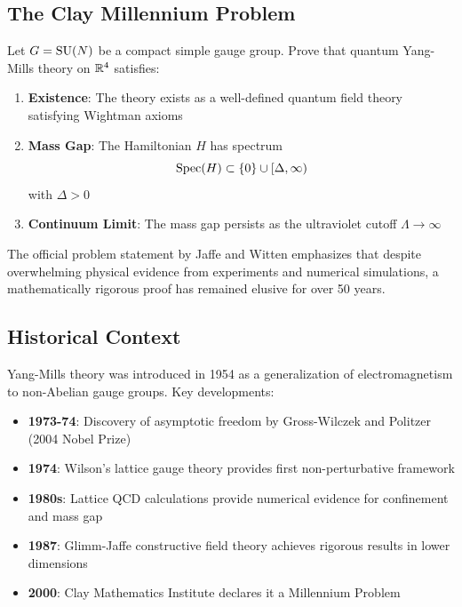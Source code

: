 \subsection{The Clay Millennium Problem}

\begin{defn}\label{def:ym-problem}
Let $G = \mathrm{SU}(N)$ be a compact simple gauge group. Prove that quantum Yang-Mills theory on $\mathbb{R}^4$ satisfies:

\begin{enumerate}
\item \textbf{Existence}: The theory exists as a well-defined quantum field theory satisfying Wightman axioms\cite{wightman1956quantum}
\item \textbf{Mass Gap}: The Hamiltonian $H$ has spectrum
\begin{equation}
\operatorname{Spec}(H) \subset \{0\} \cup [\Delta, \infty)
\end{equation}
with $\Delta > 0$
\item \textbf{Continuum Limit}: The mass gap persists as the ultraviolet cutoff $\Lambda \to \infty$
\end{enumerate}
\end{defn}

The official problem statement by Jaffe and Witten\cite{jaffe2006quantum} emphasizes that despite overwhelming physical evidence from experiments and numerical simulations, a mathematically rigorous proof has remained elusive for over 50 years.

\subsection{Historical Context}

Yang-Mills theory was introduced in 1954\cite{yang1954conservation} as a generalization of electromagnetism to non-Abelian gauge groups. Key developments:

\begin{itemize}
\item \textbf{1973-74}: Discovery of asymptotic freedom by Gross-Wilczek\cite{gross1973ultraviolet} and Politzer\cite{politzer1973reliable} (2004 Nobel Prize)
\item \textbf{1974}: Wilson's lattice gauge theory\cite{wilson1974confinement} provides first non-perturbative framework
\item \textbf{1980s}: Lattice QCD calculations\cite{creutz1980monte} provide numerical evidence for confinement and mass gap
\item \textbf{1987}: Glimm-Jaffe constructive field theory\cite{glimm1987quantum} achieves rigorous results in lower dimensions
\item \textbf{2000}: Clay Mathematics Institute declares it a Millennium Problem
\end{itemize}

